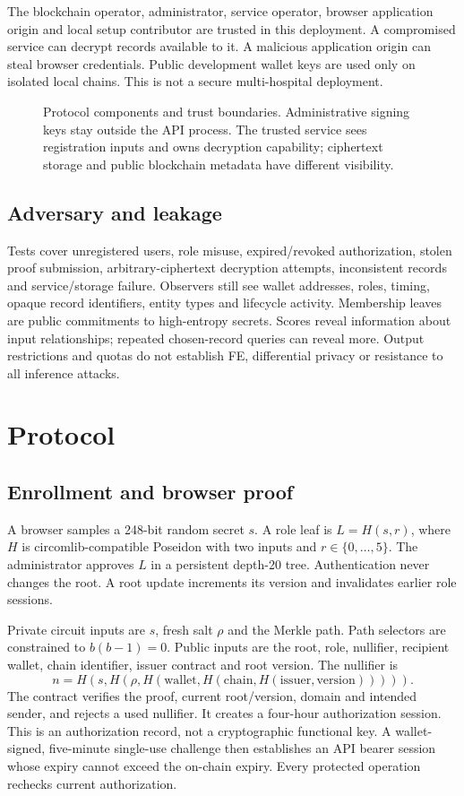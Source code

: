 \documentclass[11pt,a4paper]{article}
\begin{document}
The blockchain operator, administrator, service operator, browser application origin and local setup contributor are trusted in this deployment. A compromised service can decrypt records available to it. A malicious application origin can steal browser credentials. Public development wallet keys are used only on isolated local chains. This is not a secure multi-hospital deployment.

\begin{figure}[ht]\centering

\caption{Protocol components and trust boundaries. Administrative signing keys stay outside the API process. The trusted service sees registration inputs and owns decryption capability; ciphertext storage and public blockchain metadata have different visibility.}
\end{figure}

\subsection{Adversary and leakage}
Tests cover unregistered users, role misuse, expired/revoked authorization, stolen proof submission, arbitrary-ciphertext decryption attempts, inconsistent records and service/storage failure. Observers still see wallet addresses, roles, timing, opaque record identifiers, entity types and lifecycle activity. Membership leaves are public commitments to high-entropy secrets. Scores reveal information about input relationships; repeated chosen-record queries can reveal more. Output restrictions and quotas do not establish FE, differential privacy or resistance to all inference attacks.

\section{Protocol}
\subsection{Enrollment and browser proof}
A browser samples a 248-bit random secret $s$. A role leaf is $L=H(s,r)$, where $H$ is circomlib-compatible Poseidon with two inputs and $r\in\{0,\ldots,5\}$. The administrator approves $L$ in a persistent depth-20 tree. Authentication never changes the root. A root update increments its version and invalidates earlier role sessions.

Private circuit inputs are $s$, fresh salt $\rho$ and the Merkle path. Path selectors are constrained to $b(b-1)=0$. Public inputs are the root, role, nullifier, recipient wallet, chain identifier, issuer contract and root version. The nullifier is
\[
n=H(s,H(\rho,H(\mathrm{wallet},H(\mathrm{chain},H(\mathrm{issuer},\mathrm{version}))))).
\]
The contract verifies the proof, current root/version, domain and intended sender, and rejects a used nullifier. It creates a four-hour authorization session. This is an authorization record, not a cryptographic functional key. A wallet-signed, five-minute single-use challenge then establishes an API bearer session whose expiry cannot exceed the on-chain expiry. Every protected operation rechecks current authorization.
\end{document}
